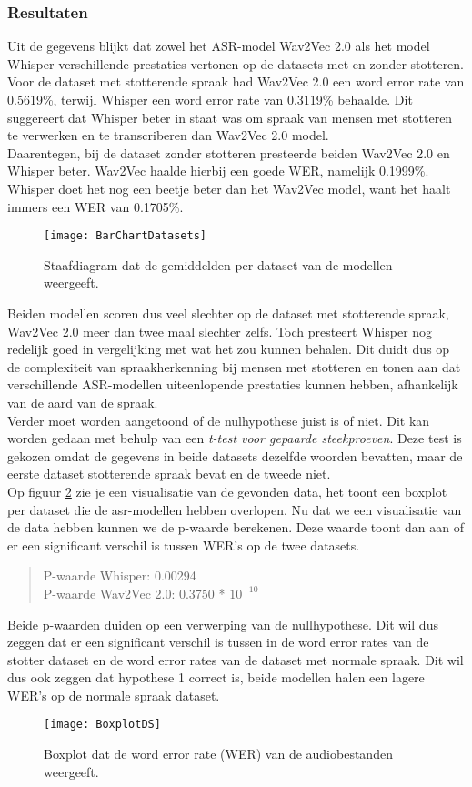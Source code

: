 \subsubsection{Resultaten}
Uit de gegevens blijkt dat zowel het ASR-model Wav2Vec 2.0 als het model Whisper verschillende prestaties vertonen op de datasets met en zonder stotteren. Voor de dataset met stotterende spraak had Wav2Vec 2.0 een word error rate van 0.5619\%, terwijl Whisper een word error rate van 0.3119\% behaalde. Dit suggereert dat Whisper beter in staat was om spraak van mensen met stotteren te verwerken en te transcriberen dan Wav2Vec 2.0 model.\\

Daarentegen, bij de dataset zonder stotteren presteerde beiden Wav2Vec 2.0 en Whisper beter. Wav2Vec haalde hierbij een goede WER, namelijk 0.1999\%. Whisper doet het nog een beetje beter dan het Wav2Vec model, want het haalt immers een WER van 0.1705\%.\\
\begin{figure}[H]
    \texttt{[image: BarChartDatasets]}
    \caption{Staafdiagram dat de gemiddelden per dataset van de modellen weergeeft.}
    \label{fig:barchart}
\end{figure}
Beiden modellen scoren dus veel slechter op de dataset met stotterende spraak, Wav2Vec 2.0 meer dan twee maal slechter zelfs. Toch presteert Whisper nog redelijk goed in vergelijking met wat het zou kunnen behalen. Dit duidt dus op de complexiteit van spraakherkenning bij mensen met stotteren en tonen aan dat verschillende ASR-modellen uiteenlopende prestaties kunnen hebben, afhankelijk van de aard van de spraak.\\

Verder moet worden aangetoond of de nulhypothese juist is of niet. Dit kan worden gedaan met behulp van een \emph{t-test voor gepaarde steekproeven}. Deze test is gekozen omdat de gegevens in beide datasets dezelfde woorden bevatten, maar de eerste dataset stotterende spraak bevat en de tweede niet.\\

Op figuur \ref{fig:boxplot} zie je een visualisatie van de gevonden data, het toont een boxplot per dataset die de asr-modellen hebben overlopen. Nu dat we een visualisatie van de data hebben kunnen we de p-waarde berekenen. Deze waarde toont dan aan of er een significant verschil is tussen WER's op de twee datasets.
\begin{quote}
    P-waarde Whisper: 0.00294\\
    P-waarde Wav2Vec 2.0: 0.3750 * $10^{-10}$ 
\end{quote} 
Beide p-waarden duiden op een verwerping van de nullhypothese. Dit wil dus zeggen dat er een significant verschil is tussen in de word error rates van de stotter dataset en de word error rates van de dataset met normale spraak. Dit wil dus ook zeggen dat hypothese 1 correct is, beide modellen halen een lagere WER's op de normale spraak dataset.

\begin{figure}[H]
    \texttt{[image: BoxplotDS]}
    \caption{Boxplot dat de word error rate (WER) van de audiobestanden weergeeft.}
    \label{fig:boxplot}
\end{figure}

